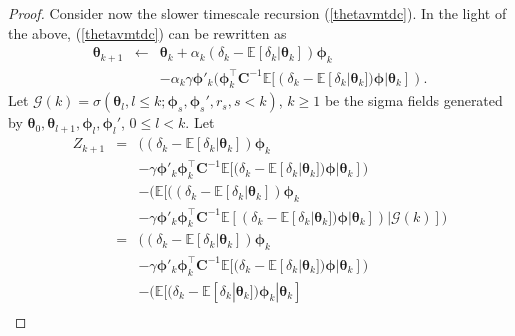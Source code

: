 \begin{proof}
    Consider now the slower timescale recursion (\ref{thetavmtdc}). In the light of the above,
    (\ref{thetavmtdc}) can be rewritten as 
    \begin{equation*}
        \begin{array}{ccl}
            {\bm{\theta}}_{k+1} &\leftarrow& {\bm{\theta}}_{k} + \alpha_k (\delta_k -\mathbb{E}[\delta_k|{\bm{\theta}}_k]) {\bm{\phi}}_k\\
            &&- \alpha_k \gamma{\bm{\phi}}'_{k}({\bm{\phi}}^{\top}_k \textbf{C}^{-1}\mathbb{E}[(\delta_k -\mathbb{E}[\delta_k|{\bm{\theta}}_k]){\bm{\phi}}|{\bm{\theta}}_k]).
         \end{array}
    \end{equation*}
    Let $\mathcal{G}(k)=\sigma({\bm{\theta}}_l,l\leq k;{\bm{\phi}}_s,{\bm{\phi}}_s',r_s,s<k)$, 
    $k\geq 1$ be the sigma fields
    generated by ${\bm{\theta}}_0,{\bm{\theta}}_{l+1},{\bm{\phi}}_l,{\bm{\phi}}_l'$,
    $0\leq l<k$. Let
    \begin{equation*}
        \begin{array}{ccl}
     Z_{k+1}&=&\big((\delta_k -\mathbb{E}[\delta_k|{\bm{\theta}}_k]) {\bm{\phi}}_k \\
            &&- \gamma {\bm{\phi}}'_{k}{\bm{\phi}}^{\top}_k \textbf{C}^{-1}\mathbb{E}[(\delta_k -\mathbb{E}[\delta_k|{\bm{\theta}}_k]){\bm{\phi}}|{\bm{\theta}}_k]\big)\\ 
         & &-\big(\mathbb{E}[((\delta_k -\mathbb{E}[\delta_k|{\bm{\theta}}_k]) {\bm{\phi}}_k \\
        &&- \gamma {\bm{\phi}}'_{k}{\bm{\phi}}^{\top}_k \textbf{C}^{-1}\mathbb{E}[(\delta_k -\mathbb{E}[\delta_k|{\bm{\theta}}_k]){\bm{\phi}}|{\bm{\theta}}_k])|\mathcal{G}(k)]\big)\\
        &=&\big((\delta_k -\mathbb{E}[\delta_k|{\bm{\theta}}_k]) {\bm{\phi}}_k \\
    &&-\gamma {\bm{\phi}}'_{k}{\bm{\phi}}^{\top}_k \textbf{C}^{-1}\mathbb{E}[(\delta_k -\mathbb{E}[\delta_k|{\bm{\theta}}_k]){\bm{\phi}}|{\bm{\theta}}_k]\big)\\
        & &-\big(\mathbb{E}[(\delta_k -\mathbb{E}[\delta_k|{\bm{\theta}}_k]) {\bm{\phi}}_k|{\bm{\theta}}_k]\\

\end{array}
\end{equation*}
\end{proof}
